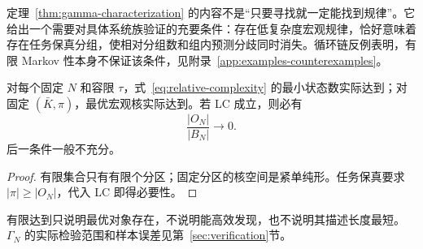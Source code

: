 定理~\ref{thm:gamma-characterization} 的内容不是“只要寻找就一定能找到规律”。它给出一个需要对具体系统族验证的充要条件：存在低复杂度宏观规律，恰好意味着存在任务保真分组，使相对分组数和组内预测分歧同时消失。循环链反例表明，有限 Markov 性本身不保证该条件，见附录~\ref{app:examples-counterexamples}。

\begin{corollary}[有限达到与必要快检]
\label{cor:attainment-output}
对每个固定 $N$ 和容限 $\tau$，式~\eqref{eq:relative-complexity} 的最小状态数实际达到；对固定 $(\bar K,\pi)$，最优宏观核实际达到。若 LC 成立，则必有
\[
\frac{|O_N|}{|B_N|}\to0.
\]
后一条件一般不充分。
\end{corollary}

\begin{proof}
有限集合只有有限个分区；固定分区的核空间是紧单纯形。任务保真要求 $|\pi|\ge|O_N|$，代入 LC 即得必要性。
\end{proof}

有限达到只说明最优对象存在，不说明能高效发现，也不说明其描述长度最短。$\Gamma_N$ 的实际检验范围和样本误差见第~\ref{sec:verification}节。
